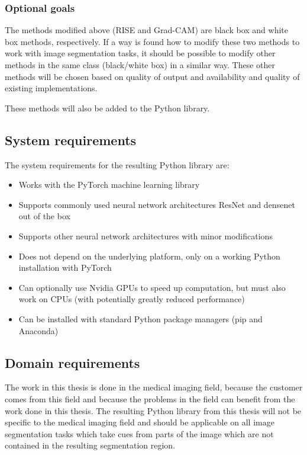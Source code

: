 \subsubsection{Optional goals}
The methods modified above (RISE and Grad-CAM) are black box and white box methods, respectively.
If a way is found how to modify these two methods to work with image segmentation tasks, it should be possible to modify other
methods in the same class (black/white box) in a similar way. These other methods will be chosen based on quality of output and availability and quality of existing implementations.

These methods will also be added to the Python library.

\subsection{System requirements}
The system requirements for the resulting Python library are:

\begin{itemize}
    \item Works with the PyTorch machine learning library
    \item Supports commonly used neural network architectures ResNet and densenet out of the box
    \item Supports other neural network architectures with minor modifications
    \item Does not depend on the underlying platform, only on a working Python installation with PyTorch
    \item Can optionally use Nvidia GPUs to speed up computation, but must also work on CPUs (with potentially greatly reduced performance)
    \item Can be installed with standard Python package managers (pip and Anaconda)
\end{itemize}

\subsection{Domain requirements}
The work in this thesis is done in the medical imaging field, because the customer comes from this field and because the problems in the field can benefit from the
work done in this thesis. The resulting Python library from this thesis will not be specific to the medical imaging field and should be applicable on all image segmentation tasks which take cues from parts of the image which are not contained in the resulting segmentation region.

